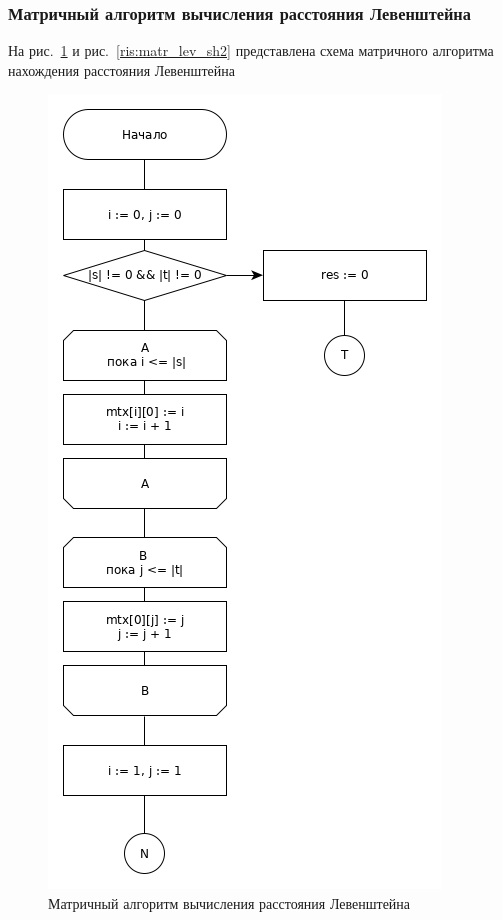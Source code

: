\documentclass[a4paper,12pt]{article}
\begin{document}
    \afterpage{\FloatBarrier}
    \subsubsection{Матричный алгоритм вычисления расстояния Левенштейна}
        На рис.~\ref{ris:matr_lev_sh1} и рис.~\ref{ris:matr_lev_sh2} представлена схема матричного алгоритма нахождения расстояния Левенштейна
		 		\begin{figure}[h]
		 			\centering
		 			{
		 				\includegraphics[scale=0.51]{lm.png}
		 				\caption{Матричный алгоритм вычисления расстояния Левенштейна}
		 				\label{ris:matr_lev_sh1}
		 			}
		 		\end{figure}
\end{document}
